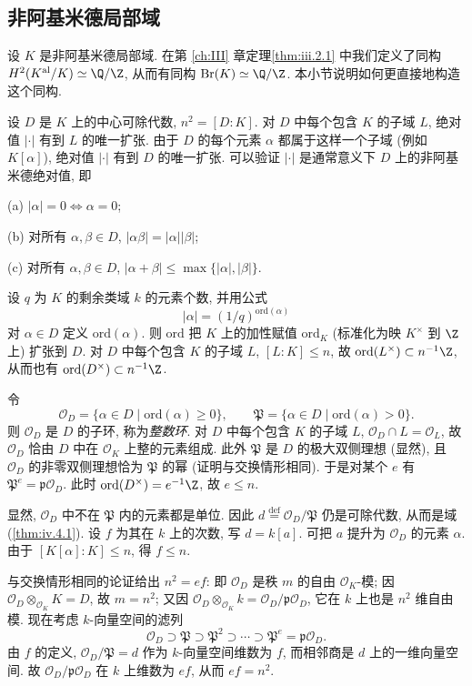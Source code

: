 \subsection*{非阿基米德局部域}

设 $K$ 是非阿基米德局部域. 在第 \ref{ch:III} 章定理\ref{thm:iii.2.1} 中我们定义了同构 $H^2(K^{\mathrm{al}}/K)\simeq\Q/\Z$, 从而有同构 $\Br(K)\simeq\Q/\Z$. 本小节说明如何更直接地构造这个同构.

设 $D$ 是 $K$ 上的中心可除代数, $n^2=[D:K]$. 对 $D$ 中每个包含 $K$ 的子域 $L$, 绝对值 $|\cdot|$ 有到 $L$ 的唯一扩张. 由于 $D$ 的每个元素 $\alpha$ 都属于这样一个子域 (例如 $K[\alpha]$), 绝对值 $|\cdot|$ 有到 $D$ 的唯一扩张. 可以验证 $|\cdot|$ 是通常意义下 $D$ 上的非阿基米德绝对值, 即

(a) $|\alpha|=0\iff\alpha=0$;

(b) 对所有 $\alpha,\beta\in D$, $|\alpha\beta|=|\alpha||\beta|$;

(c) 对所有 $\alpha,\beta\in D$, $|\alpha+\beta|\le\max\{|\alpha|,|\beta|\}$.

设 $q$ 为 $K$ 的剩余类域 $k$ 的元素个数, 并用公式
\[
|\alpha|=(1/q)^{\mathrm{ord}(\alpha)}
\]
对 $\alpha\in D$ 定义 $\mathrm{ord}(\alpha)$. 则 $\mathrm{ord}$ 把 $K$ 上的加性赋值 $\mathrm{ord}_K$ (标准化为映 $K^{\times}$ 到 $\Z$ 上) 扩张到 $D$. 对 $D$ 中每个包含 $K$ 的子域 $L$, $[L:K]\le n$, 故 $\mathrm{ord}(L^{\times})\subset n^{-1}\Z$, 从而也有 $\mathrm{ord}(D^{\times})\subset n^{-1}\Z$.

令
\[
\mathcal{O}_{D}=\{\alpha\in D\mid\mathrm{ord}(\alpha)\ge0\},\qquad
\mathfrak{P}=\{\alpha\in D\mid\mathrm{ord}(\alpha)>0\}.
\]
则 $\mathcal{O}_D$ 是 $D$ 的子环, 称为\emph{整数环}. 对 $D$ 中每个包含 $K$ 的子域 $L$, $\mathcal{O}_D\cap L=\mathcal{O}_L$, 故 $\mathcal{O}_D$ 恰由 $D$ 中在 $\mathcal{O}_K$ 上整的元素组成. 此外 $\mathfrak{P}$ 是 $D$ 的极大双侧理想 (显然), 且 $\mathcal{O}_D$ 的非零双侧理想恰为 $\mathfrak{P}$ 的幂 (证明与交换情形相同). 于是对某个 $e$ 有 $\mathfrak{P}^e=\mathfrak{p}\mathcal{O}_D$. 此时 $\mathrm{ord}(D^{\times})=e^{-1}\Z$, 故 $e\le n$.

显然, $\mathcal{O}_D$ 中不在 $\mathfrak{P}$ 内的元素都是单位. 因此 $d\stackrel{\mathrm{def}}{=}\mathcal{O}_D/\mathfrak{P}$ 仍是可除代数, 从而是域 (\ref{thm:iv.4.1}). 设 $f$ 为其在 $k$ 上的次数, 写 $d=k[a]$. 可把 $a$ 提升为 $\mathcal{O}_D$ 的元素 $\alpha$. 由于 $[K[\alpha]:K]\le n$, 得 $f\le n$.

与交换情形相同的论证给出 $n^2=ef$: 即 $\mathcal{O}_D$ 是秩 $m$ 的自由 $\mathcal{O}_K$-模; 因 $\mathcal{O}_D\otimes_{\mathcal{O}_K}K=D$, 故 $m=n^2$; 又因 $\mathcal{O}_D\otimes_{\mathcal{O}_K}k=\mathcal{O}_D/\mathfrak{p}\mathcal{O}_D$, 它在 $k$ 上也是 $n^2$ 维自由模. 现在考虑 $k$-向量空间的滤列
\[
\mathcal{O}_{D}\supset\mathfrak{P}\supset\mathfrak{P}^{2}\supset\cdots\supset\mathfrak{P}^{e}=\mathfrak{p}\mathcal{O}_{D}.
\]
由 $f$ 的定义, $\mathcal{O}_D/\mathfrak{P}=d$ 作为 $k$-向量空间维数为 $f$, 而相邻商是 $d$ 上的一维向量空间. 故 $\mathcal{O}_D/\mathfrak{p}\mathcal{O}_D$ 在 $k$ 上维数为 $ef$, 从而 $ef=n^2$.

